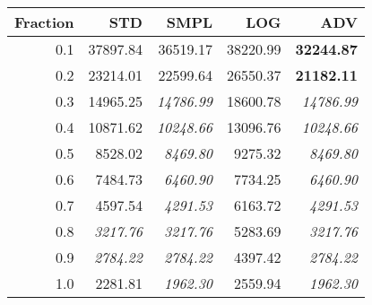 \documentclass{standalone}
\begin{document}
\begin{tabular}{r|rrrr}
      \toprule
      Fraction & STD & SMPL & LOG & ADV\\
      \midrule
      0.1 & 37897.84 & 36519.17 & 38220.99 & \textbf{32244.87}\\
  0.2 & 23214.01 & 22599.64 & 26550.37 & \textbf{21182.11}\\
  0.3 & 14965.25 & \emph{14786.99} & 18600.78 & \emph{14786.99}\\
  0.4 & 10871.62 & \emph{10248.66} & 13096.76 & \emph{10248.66}\\
  0.5 & 8528.02 & \emph{8469.80} & 9275.32 & \emph{8469.80}\\
  0.6 & 7484.73 & \emph{6460.90} & 7734.25 & \emph{6460.90}\\
  0.7 & 4597.54 & \emph{4291.53} & 6163.72 & \emph{4291.53}\\
  0.8 & \emph{3217.76} & \emph{3217.76} & 5283.69 & \emph{3217.76}\\
  0.9 & \emph{2784.22} & \emph{2784.22} & 4397.42 & \emph{2784.22}\\
  1.0 & 2281.81 & \emph{1962.30} & 2559.94 & \emph{1962.30}\\
  \bottomrule
\end{tabular}
\end{document}
